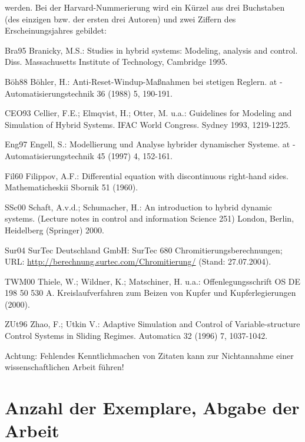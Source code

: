 werden. Bei der Harvard-Nummerierung wird ein Kürzel aus drei Buchstaben (des einzigen bzw. der ersten drei Autoren) und zwei Ziffern des Erscheinungsjahres gebildet: \begin{list}{[AAAAAA]}{
    \setlength{\leftmargin}{2.6cm} 
    \setlength{\labelwidth}{2cm} 
    \renewcommand{\makelabel}[1]{[#1]}
  }
  \item[Bra95]  Branicky, M.S.: Studies in hybrid systems: Modeling, analysis and control. Diss. Massachusetts Institute of Technology, Cambridge 1995.
  \item[Böh88]  Böhler, H.: Anti-Reset-Windup-Maßnahmen bei stetigen Reglern. at - Automatisierungstechnik 36 (1988) 5, 190-191.
  \item[CEO93]  Cellier, F.E.; Elmqvist, H.; Otter, M. u.a.: Guidelines for Modeling and Simulation of Hybrid Systems. IFAC World Congress. Sydney 1993, 1219-1225.
  \item[Eng97]  Engell, S.: Modellierung und Analyse hybrider dynamischer Systeme. at - Automatisierungstechnik 45 (1997) 4, 152-161.
  \item[Fil60]  Filippov, A.F.: Differential equation with discontinuous right-hand sides. Mathematicheskii Sbornik 51 (1960).
  \item[SSc00]  Schaft, A.v.d.; Schumacher, H.: An introduction to hybrid dynamic systems. (Lecture notes in control and information Science 251) London, Berlin, Heidelberg (Springer) 2000.
  \item[Sur04]  SurTec Deutschland GmbH: SurTec 680 Chromitierungsberechnungen; URL: \href{http://berechnung.surtec.com/Chromitierung/}{http://berechnung.surtec.com/Chromitierung/} (Stand: 27.07.2004).
  \item[TWM00]  Thiele, W.; Wildner, K.; Matschiner, H. u.a.: Offenlegungsschrift OS DE 198 50 530 A. Kreislaufverfahren zum Beizen von Kupfer und Kupferlegierungen (2000).
  \item[ZUt96]  Zhao, F.; Utkin V.: Adaptive Simulation and Control of Variable-structure Control Systems in Sliding Regimes. Automatica 32 (1996) 7, 1037-1042.
\end{list}
Achtung: Fehlendes Kenntlichmachen von Zitaten kann zur Nichtannahme einer wissenschaftlichen Arbeit führen!


\section{Anzahl der Exemplare, Abgabe der Arbeit}
\label{sec:AnzahlDerExemplareAbgabeDerArbeit}

